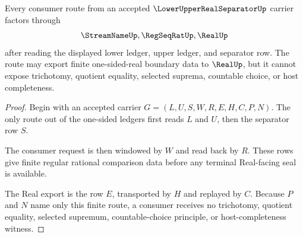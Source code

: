 \begin{theorem}
\label{thm:lower-upper-real-separator-real-route}
Every consumer route from an accepted $\LowerUpperRealSeparatorUp$ carrier factors through
$$
\StreamNameUp,\RegSeqRatUp,\RealUp
$$
after reading the displayed lower ledger, upper ledger, and separator row. The route may export finite one-sided-real boundary data to $\RealUp$, but it cannot expose trichotomy, quotient equality, selected suprema, countable choice, or host completeness.
\end{theorem}
\begin{proof}
Begin with an accepted carrier $G=(L,U,S,W,R,E,H,C,P,N)$. The only route out of the one-sided ledgers first reads $L$ and $U$, then the separator row $S$.

The consumer request is then windowed by $W$ and read back by $R$. These rows give finite regular rational comparison data before any terminal Real-facing seal is available.

The Real export is the row $E$, transported by $H$ and replayed by $C$. Because $P$ and $N$ name only this finite route, a consumer receives no trichotomy, quotient equality, selected supremum, countable-choice principle, or host-completeness witness.
\end{proof}


\begin{closurestatus}{\LowerUpperRealSeparatorUp}
  \theoryclosure{\seedClosure}
  \formalstatus{\unformalizedV}
\end{closurestatus}
